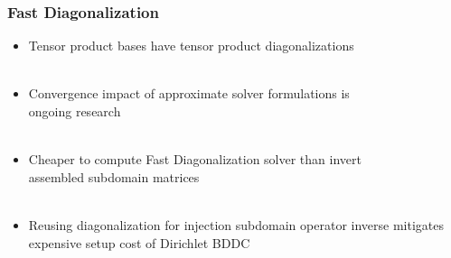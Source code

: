 \documentclass{beamer}
\begin{document}
\begin{frame}
\begin{center}
\frametitle{Fast Diagonalization}

\begin{itemize}

\item Tensor product bases have tensor product diagonalizations\\

~\\

\item Convergence impact of approximate solver formulations is\\ongoing research\\

~\\

\item Cheaper to compute Fast Diagonalization solver than invert\\assembled subdomain matrices\\

~\\

\item Reusing diagonalization for injection subdomain operator inverse mitigates expensive setup cost of Dirichlet BDDC\\

\end{itemize}

\end{center}
\end{frame}

\end{document}
